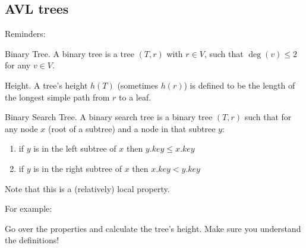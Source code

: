 \subsection{AVL trees}
    Reminders:
    \begin{defbox}{Binary Tree.}
        A binary tree is a tree $(T,r)$ with $r\in V$, such that $\deg(v)
            \leq 2$ for any $v\in V$.
    \end{defbox}
    \begin{defbox}{Height.} A tree's height $h(T)$ (sometimes $h(r)$) is defined to be the
    length of the
    longest
    simple path from $r$ to a leaf.
    \end{defbox}
    \begin{defbox}{ Binary Search Tree. } A binary search tree is a binary tree $(T,r)$ such that for any
    node $x$ (root of a subtree) and a node in that subtree $y$:
    \begin{enumerate}
        \item if $y$ is in the left subtree of $x$ then $y.key \leq x.key$
        \item if $y$ is in the right subtree of $x$ then $x.key < y.key$
    \end{enumerate}
        Note that this is a (relatively) local property.
    \end{defbox}
For example:\\
    \begin{center}
    \end{center}
\begin{remark} Go over the properties and calculate the tree's height. Make sure you understand the definitions!
\end{remark}

